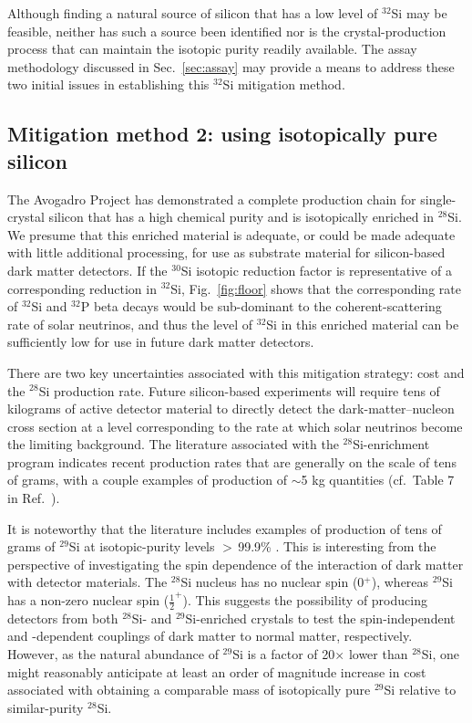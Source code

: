 \documentclass[final,5p]{elsarticle}
\def\si{$^{32}$Si\xspace}
\def\p{$^{32}$P\xspace}
\def\esi{$^{28}$Si\xspace}
\begin{document}
Although finding a natural source of silicon that has a low level of \si may be feasible, neither has such a source been identified nor is the crystal-production process that can maintain the isotopic purity readily available. The assay methodology discussed in Sec.\ \ref{sec:assay} may provide a means to address these two initial issues in establishing this \si mitigation method.

\subsection{Mitigation method 2: using isotopically pure silicon}\label{ssec:mitigation2}
The Avogadro Project has demonstrated a complete production chain for single-crystal silicon that has a high chemical purity and is isotopically enriched in \esi. We presume that this enriched material is adequate, or could be made adequate with little additional processing, for use as substrate material for silicon-based dark matter detectors. If the $^{30}$Si isotopic reduction factor is representative of a corresponding reduction in \si, Fig.\ \ref{fig:floor} shows that the corresponding rate of \si and \p beta decays would be sub-dominant to the coherent-scattering rate of solar neutrinos, and thus the level of \si in this enriched material can be sufficiently low for use in future dark matter detectors.

There are two key uncertainties associated with this mitigation strategy: cost and the \esi production rate. Future silicon-based experiments will require tens of kilograms of active detector material to directly detect the dark-matter--nucleon cross section at a level corresponding to the rate at which solar neutrinos become the limiting background. The literature associated with the \esi-enrichment program indicates recent production rates that are generally on the scale of tens of grams, with a couple examples of production of $\sim$5 kg quantities (cf.\ Table 7 in Ref.\ \cite{wang}).

It is noteworthy that the literature includes examples of production of tens of grams of $^{29}$Si at isotopic-purity levels $>$\,99.9\% \cite{wang,Churbanov}.  This is interesting from the perspective of investigating the spin dependence of the interaction of dark matter with detector materials. The \esi nucleus has no nuclear spin (0$^{+}$), whereas $^{29}$Si has a non-zero nuclear spin ($\frac{1}{2}^{+}$). This suggests the possibility of producing detectors from both \esi- and $^{29}$Si-enriched crystals to test the spin-independent and -dependent couplings of dark matter to normal matter, respectively. However, as the natural abundance of $^{29}$Si is a factor of 20$\times$ lower than \esi, one might reasonably anticipate at least an order of magnitude increase in cost associated with obtaining a comparable mass of isotopically pure $^{29}$Si relative to similar-purity \esi.
\end{document}
